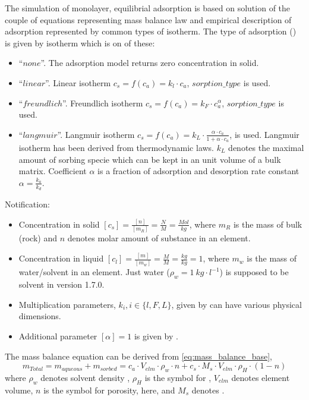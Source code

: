 The simulation of monolayer, equilibrial adsorption is based on solution of the couple of equations 
representing mass balance law and empirical description of adsorption represented by common types of isotherm. 
The type of adsorption () is given by isotherm which is on of these:
\begin{itemize}
 \item ``$none$''. The adsorption model returns zero concentration in solid.
 \item ``$linear$''. Linear isotherm $c_s = f(c_a) = k_l\cdot c_a$, $sorption\_type$ is used.
 \item ``$freundlich$''. Freundlich isotherm $c_s = f(c_a) = k_F\cdot c_a^{\alpha}$, $sorption\_type$ is used.
 \item ``$langmuir$''. Langmuir isotherm $c_s = f(c_a) = k_L\cdot \frac{\alpha\cdot c_a}{1 + \alpha\cdot c_a}$,  
       is used. Langmuir isotherm has been derived from thermodynamic laws. $k_L$ denotes the maximal amount 
       of sorbing specie which can be kept in an unit volume of a bulk matrix. Coefficient $\alpha$ is 
       a fraction of adsorption and desorption rate constant $\alpha = \frac{k_a}{k_d}$.
\end{itemize}
Notification:
\begin{itemize}
 \item Concentration in solid $[c_s] = \frac{[n]}{[m_R]} = \frac{N}{M} = \frac{Mol}{kg}$, where $m_R$ is the 
       mass of bulk (rock) and $n$ denotes molar amount of substance in an element.
 \item Concentration in liquid $[c_l] = \frac{[m]}{[m_w]} = \frac{M}{M} = \frac{kg}{kg} = 1$, where $m_w$ is 
       the mass of water/solvent in an element. Just water ($\rho_w = 1~kg\cdot l^{-1}$) is supposed to be 
       solvent in version 1.7.0. 
 \item Multiplication parameters, $k_i, i\in\{ l,F,L\}$, given by 
        can have various physical dimensions.
 \item Additional parameter $[\alpha] = 1$ is given by .
\end{itemize}
The mass balance equation can be derived from \ref{eq:mass_balance_base},
\begin{equation}
  m_{Total} = m_{aqueous} + m_{sorbed} = c_a\cdot V_{elm}\cdot\rho_w\cdot n + c_s\cdot M_s \cdot V_{elm}\cdot\rho_H\cdot(1-n)
  \label{eq:mass_balance_base}
\end{equation}
where $\rho_w$ denotes solvent density , $\rho_H$ is the symbol for , $V_{elm}$ denotes element volume, $n$ is the symbol for porosity, here, and $M_s$ denotes .

